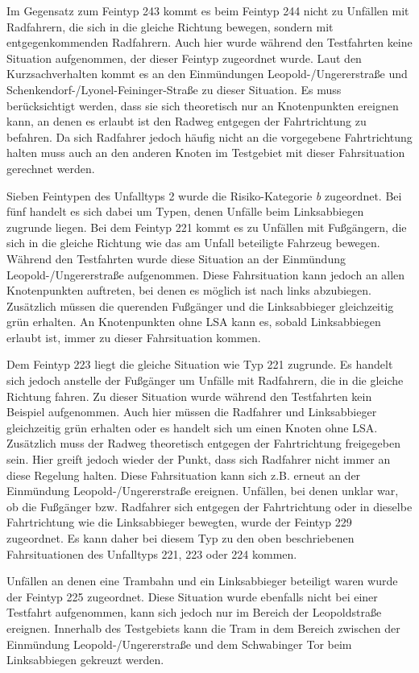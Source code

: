 Im Gegensatz zum Feintyp 243 kommt es beim Feintyp 244 nicht zu Unfällen mit Radfahrern, die sich in die gleiche Richtung bewegen, sondern mit entgegenkommenden Radfahrern. Auch hier wurde während den Testfahrten keine Situation aufgenommen, der dieser Feintyp zugeordnet wurde. Laut den Kurzsachverhalten kommt es an den Einmündungen Leopold-/Ungererstraße und Schenkendorf-/Lyonel-Feininger-Straße zu dieser Situation. Es muss berücksichtigt werden, dass sie sich theoretisch nur an Knotenpunkten ereignen kann, an denen es erlaubt ist den Radweg entgegen der Fahrtrichtung zu befahren. Da sich Radfahrer jedoch häufig nicht an die vorgegebene Fahrtrichtung halten muss auch an den anderen Knoten im Testgebiet mit dieser Fahrsituation gerechnet werden.

Sieben Feintypen des Unfalltyps 2 wurde die Risiko-Kategorie \textit{b} zugeordnet. Bei fünf handelt es sich dabei um Typen, denen Unfälle beim Linksabbiegen zugrunde liegen. Bei dem Feintyp 221 kommt es zu Unfällen mit Fußgängern, die sich in die gleiche Richtung wie das am Unfall beteiligte Fahrzeug bewegen. Während den Testfahrten wurde diese Situation an der Einmündung Leopold-/Ungererstraße aufgenommen. Diese Fahrsituation kann jedoch an allen Knotenpunkten auftreten, bei denen es möglich ist nach links abzubiegen. Zusätzlich müssen die querenden Fußgänger und die Linksabbieger gleichzeitig grün erhalten. An Knotenpunkten ohne \ac{LSA} kann es, sobald Linksabbiegen erlaubt ist, immer zu dieser Fahrsituation kommen.   

Dem Feintyp 223 liegt die gleiche Situation wie Typ 221 zugrunde. Es handelt sich jedoch anstelle der Fußgänger um Unfälle mit Radfahrern, die in die gleiche Richtung fahren. Zu dieser Situation wurde während den Testfahrten kein Beispiel aufgenommen. Auch hier müssen die Radfahrer und Linksabbieger gleichzeitig grün erhalten oder es handelt sich um einen Knoten ohne \ac{LSA}. Zusätzlich muss der Radweg theoretisch entgegen der Fahrtrichtung freigegeben sein. Hier greift jedoch wieder der Punkt, dass sich Radfahrer nicht immer an diese Regelung halten. Diese Fahrsituation kann sich z.B. erneut an der Einmündung Leopold-/Ungererstraße ereignen. Unfällen, bei denen unklar war, ob die Fußgänger bzw. Radfahrer sich entgegen der Fahrtrichtung oder in dieselbe Fahrtrichtung wie die Linksabbieger bewegten, wurde der Feintyp 229 zugeordnet. Es kann daher bei diesem Typ zu den oben beschriebenen Fahrsituationen des Unfalltyps 221, 223 oder 224 kommen.

Unfällen an denen eine Trambahn und ein Linksabbieger beteiligt waren wurde der Feintyp 225 zugeordnet. Diese Situation wurde ebenfalls nicht bei einer Testfahrt aufgenommen, kann sich jedoch nur im Bereich der Leopoldstraße ereignen. Innerhalb des Testgebiets kann die Tram in dem Bereich zwischen der Einmündung Leopold-/Ungererstraße und dem Schwabinger Tor beim Linksabbiegen gekreuzt werden. 

